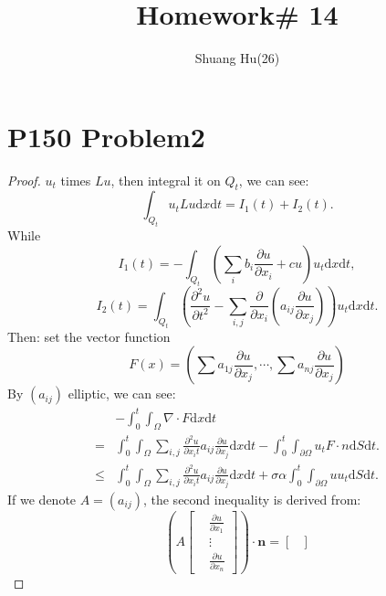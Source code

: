 \documentclass[a4paper]{ctexart}
\title{Homework\# 14}
\author{Shuang Hu(26)}
\newcommand{\dif}{\mathrm{d}}
\newcommand{\pdfFrac}[2]{\frac{\partial #1}{\partial #2}}
\begin{document}
\maketitle
\section*{P150 Problem2}
\begin{proof}
    $u_t$ times $Lu$, then integral it on $Q_{t}$, we can see:
    \begin{equation}
        \int_{Q_{t}}u_{t}Lu\dif x\dif t=I_{1}(t)+I_{2}(t).
    \end{equation}
    While 
    \begin{equation}
        I_{1}(t)=-\int_{Q_{t}}\left(\sum_{i}b_{i}\pdfFrac{u}{x_{i}}+cu\right)u_{t}\dif x\dif t,
    \end{equation}
    \begin{equation}
        I_{2}(t)=\int_{Q_{t}}\left(\pdfFrac{^2u}{t^2}-\sum_{i,j}\pdfFrac{}{x_{i}}\left(a_{ij}\pdfFrac{u}{x_{j}}\right)\right)u_{t}\dif x\dif t.
    \end{equation}
    Then: set the vector function 
    \begin{equation}
        F(x)=\left(\sum a_{1j}\pdfFrac{u}{x_{j}},\cdots,\sum a_{nj}\pdfFrac{u}{x_{j}}\right)
    \end{equation}
    By $(a_{ij})$ elliptic, we can see:
    \begin{equation}
        \label{eq:evaOfI2}
        \begin{aligned}
            &-\int_{0}^{t}\int_{\Omega}\nabla\cdot F\dif x\dif t\\
            =&\int_{0}^{t}\int_{\Omega}\sum_{i,j}\pdfFrac{^{2}u}{x_{i}t}a_{ij}\pdfFrac{u}{x_{j}}\dif x\dif t-\int_{0}^{t}\int_{\partial\Omega}u_{t}F\cdot n\dif S\dif t.\\
            \le&\int_{0}^{t}\int_{\Omega}\sum_{i,j}\pdfFrac{^{2}u}{x_{i}t}a_{ij}\pdfFrac{u}{x_{j}}\dif x\dif t+\sigma\alpha\int_{0}^{t}\int_{\partial\Omega}uu_{t}\dif S\dif t.
        \end{aligned}
    \end{equation}
    If we denote $A=(a_{ij})$, the second inequality is derived from:
    \begin{equation}
        (A\begin{bmatrix}
            &\pdfFrac{u}{x_{1}}\\
            &\vdots\\
            &\pdfFrac{u}{x_{n}}
        \end{bmatrix})\cdot\mathbf{n}=\begin{bmatrix}

\end{bmatrix}
\end{equation}
\end{proof}
\end{document}
